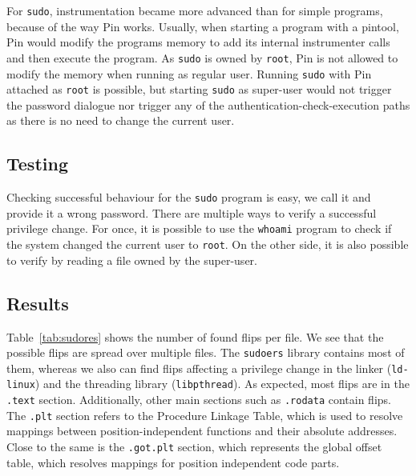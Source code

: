 For \texttt{sudo}, instrumentation became more advanced than for simple
programs, because of the way Pin works. Usually, when starting a program with a
pintool, Pin would modify the program\textquotesingle s memory to add its
internal instrumenter calls and then execute the program. As \texttt{sudo} is
owned by \texttt{root}, Pin is not allowed to modify the memory when
running as regular user. Running \texttt{sudo} with Pin attached as
\texttt{root} is possible, but starting \texttt{sudo} as super-user would not
trigger the password dialogue nor trigger any of the
authentication-check-execution paths as there is no need to change the current
user.

\subsection{Testing}

Checking successful behaviour for the \texttt{sudo} program is easy, we call it
and provide it a wrong password. There are multiple ways to verify a successful
privilege change. For once, it is possible to use the \texttt{whoami} program
to check if the system changed the current user to \texttt{root}. On the other
side, it is also possible to verify by reading a file owned by the super-user.

\subsection{Results}

Table~\ref{tab:sudores} shows the number of found flips per file. We see that
the possible flips are spread over multiple files. The \texttt{sudoers} library
contains most of them, whereas we also can find flips affecting a privilege
change in the linker (\texttt{ld-linux}) and the threading library
(\texttt{libpthread}). As expected, most flips are in the \texttt{.text}
section. Additionally, other main sections such as \texttt{.rodata} contain
flips. The \texttt{.plt} section refers to the Procedure Linkage Table, which is
used to resolve mappings between position-independent functions and their
absolute addresses. Close to the same is the \texttt{.got.plt} section, which
represents the global offset table, which resolves mappings for position
independent code parts.


